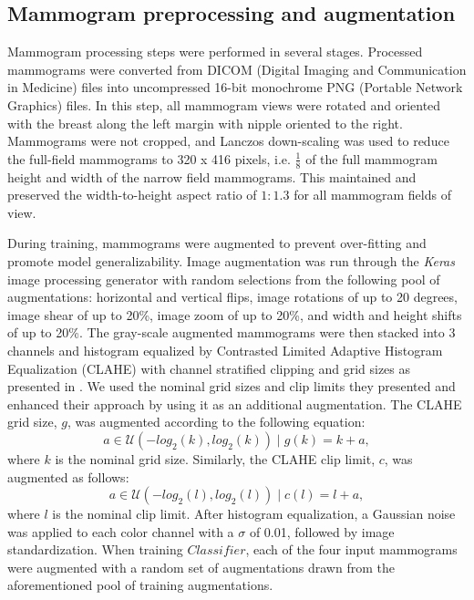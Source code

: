 \documentclass[journal]{IEEEtran}
\begin{document}
\subsection{Mammogram preprocessing and augmentation}
Mammogram processing steps were performed in several stages.  Processed mammograms were converted from DICOM (Digital Imaging and Communication in Medicine) files into uncompressed 16-bit monochrome PNG (Portable Network Graphics) files.  In this step, all mammogram views were rotated and oriented with the breast along the left margin with nipple oriented to the right.  Mammograms were not cropped, and Lanczos down-scaling was used to reduce the full-field mammograms to 320 x 416 pixels, i.e. $\frac{1}{8}$ of the full mammogram height and width of the narrow field mammograms. This maintained and preserved the width-to-height aspect ratio of $1:1.3$ for all mammogram fields of view.  

During training, mammograms were augmented to prevent over-fitting and promote model generalizability.  Image augmentation was run through the \textit{Keras} \cite{keras-2015} image processing generator with random selections from the following pool of augmentations: horizontal and vertical flips, image rotations of up to 20 degrees, image shear of up to 20\%, image zoom of up to 20\%, and width and height shifts of up to 20\%.  The gray-scale augmented mammograms were then stacked into 3 channels and histogram equalized by Contrasted Limited Adaptive Histogram Equalization (CLAHE) with channel stratified clipping and grid sizes as presented in \cite{teare-2017}.    We used the nominal grid sizes and clip limits they presented and enhanced their approach by using it as an additional augmentation. The CLAHE grid size, $g$,  was augmented according to the following equation:
\begin{equation} \label{eq:clahegrid}
a\in\mathcal{U}(-log_2(k), log_2(k)) \mid g(k) = k + a,
\end{equation}
where $k$ is the nominal grid size.  Similarly, the CLAHE clip limit, $c$, was augmented as follows:
\begin{equation} \label{eq:claheclip}
a\in\mathcal{U}(-log_2(l), log_2(l)) \mid c(l) = l + a,
\end{equation}
where $l$ is the nominal clip limit.  After histogram equalization, a Gaussian noise \cite{gaussian-2015} was applied to each color channel with a $\sigma$ of 0.01, followed by image standardization.  When training $\textit{Classifier}$, each of the four input mammograms were augmented with a random set of augmentations drawn from the aforementioned pool of training augmentations. 
\end{document}
